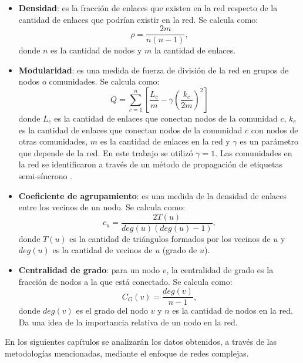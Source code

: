 \begin{itemize}
    \item \textbf{Densidad}: es la fracción de enlaces que existen en la red respecto de la cantidad de enlaces que podrían existir en la red. Se calcula como:
    \begin{equation}
        \rho = \frac{2m}{n(n-1)},
    \end{equation}
    donde $n$ es la cantidad de nodos y $m$ la cantidad de enlaces.
    \item  \textbf{Modularidad}: es una medida de fuerza de división de la red en grupos de nodos o comunidades. Se calcula como:
    \begin{equation}
        Q = \sum_{c=1}^{n}
        \left[ \frac{L_c}{m} - \gamma\left( \frac{k_c}{2m} \right) ^2 \right]
    \end{equation}
    donde $L_c$ es la cantidad de enlaces que conectan nodos de la comunidad $c$, $k_c$ es la cantidad de enlaces que conectan nodos de la comunidad $c$ con nodos de otras comunidades, $m$ es la cantidad de enlaces en la red y $\gamma$ es un parámetro que depende de la red. En este trabajo se utilizó $\gamma = 1$. Las comunidades en la red se identificaron a través de un método de propagación de etiquetas semi-síncrono \cite{cordasco2010community}.
    \item \textbf{Coeficiente de agrupamiento}: es una medida de la densidad de enlaces entre los vecinos de un nodo. Se calcula como:
    \begin{equation}
        c_u = \frac{2 T(u)}{deg(u)(deg(u)-1)},
    \end{equation}
    donde $T(u)$ es la cantidad de triángulos formados por los vecinos de $u$ y $deg(u)$ es la cantidad de vecinos de $u$ (grado de $u$).
 
   \item \textbf{Centralidad de grado}: para un nodo $v$, la centralidad de grado es la fracción de nodos a la que está conectado. Se calcula como:
    \begin{equation}
        C_G(v) = \frac{deg(v)}{n-1},
    \end{equation}
    donde $deg(v)$ es el grado del nodo $v$ y $n$ es la cantidad de nodos en la red. Da una idea de la importancia relativa de un nodo en la red.
 
\end{itemize}
En los siguientes capítulos se analizarán los datos obtenidos, a través de las metodologías mencionadas, mediante el enfoque de redes complejas.
 
 
 
 
 
 
 
 
 

